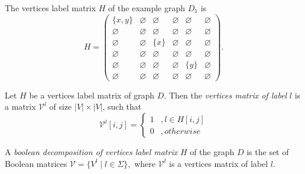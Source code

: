 The vertices label matrix $H$ of the example graph $D_1$ is
{
    \renewcommand{\arraystretch}{0.7}
    \setlength\arraycolsep{2pt}
$$
    H =
    \begin{pmatrix}
    \{x, y\}        & \varnothing     &   \varnothing      &   \varnothing   &   \varnothing   &    \varnothing  \\
    \varnothing     &   \varnothing   & \varnothing        &   \varnothing   & \varnothing     & \varnothing     \\
    \varnothing     &   \varnothing   &   \{x\}            &   \varnothing   & \varnothing     &   \varnothing   \\
    \varnothing     &   \varnothing   & \varnothing        &   \varnothing   &   \varnothing   &   \varnothing   \\
    \varnothing     &   \varnothing   &   \varnothing      &    \varnothing  &   \{y\}         & \varnothing     \\
    \varnothing     & \varnothing     &   \varnothing      &   \varnothing   & \varnothing     &   \varnothing
    \end{pmatrix}.
$$
}

\begin{definition}
Let $H$ be a vertices label matrix of graph $D$. Then the \emph{vertices matrix of label} $l$ is a matrix $\mathcal{V}^l$ of size $|V|\times|V|$, such that
\begin{equation*}
\mathcal{V}^l[i,j] =
  \begin{cases}
    1  &, l \in H[i, j] \\
    0  &, otherwise
  \end{cases}
\end{equation*}
\end{definition}

\begin{definition}
A \emph{boolean decomposition of vertices label matrix} $H$ of the graph $D$ is the set of Boolean matrices
$\mathcal{V} = \{V^l \mid l \in \Sigma\},$
where $\mathcal{V}^l$ is a vertices matrix of label $l$.
\end{definition}


